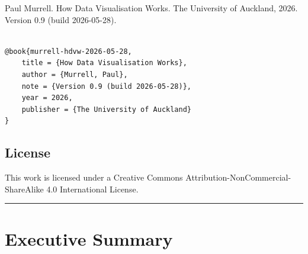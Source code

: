\documentclass[
  letterpaper,
  DIV=11,
  numbers=noendperiod]{scrreprt}
\begin{document}
Paul Murrell. How Data Visualisation Works. The University of Auckland,
2026. Version 0.9 (build 2026-05-28).

\begin{verbatim}

@book{murrell-hdvw-2026-05-28,
    title = {How Data Visualisation Works},
    author = {Murrell, Paul},
    note = {Version 0.9 (build 2026-05-28)},
    year = 2026,
    publisher = {The University of Auckland}
}
\end{verbatim}

\section*{License}\label{license}


This work is licensed under a Creative Commons
Attribution-NonCommercial-ShareAlike 4.0 International License.

\begin{center}\rule{0.5\linewidth}{0.5pt}\end{center}

\theendnotes


\chapter*{Executive Summary}\label{sec-exec}

\end{document}
